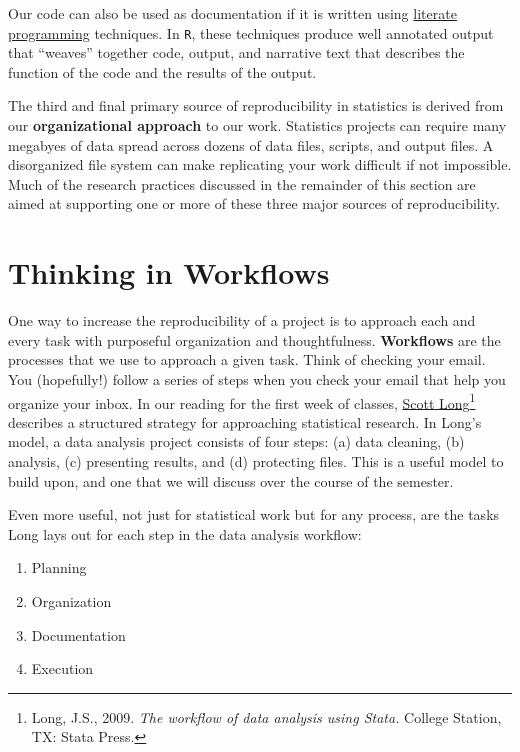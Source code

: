 \documentclass[]{book}
\providecommand{\tightlist}{%
  \setlength{\itemsep}{0pt}\setlength{\parskip}{0pt}}
\let\rmarkdownfootnote\footnote%
\def\footnote{\protect\rmarkdownfootnote}
\theoremstyle{definition}
\theoremstyle{definition}
\theoremstyle{definition}
\theoremstyle{remark}
\begin{document}
Our code can also be used as documentation if it is written using
\href{https://en.wikipedia.org/wiki/Literate_programming}{literate
programming} techniques. In \texttt{R}, these techniques produce well
annotated output that ``weaves'' together code, output, and narrative
text that describes the function of the code and the results of the
output.

The third and final primary source of reproducibility in statistics is
derived from our \textbf{organizational approach} to our work.
Statistics projects can require many megabyes of data spread across
dozens of data files, scripts, and output files. A disorganized file
system can make replicating your work difficult if not impossible. Much
of the research practices discussed in the remainder of this section are
aimed at supporting one or more of these three major sources of
reproducibility.

\section{Thinking in Workflows}\label{thinking-in-workflows}

One way to increase the reproducibility of a project is to approach each
and every task with purposeful organization and thoughtfulness.
\textbf{Workflows} are the processes that we use to approach a given
task. Think of checking your email. You (hopefully!) follow a series of
steps when you check your email that help you organize your inbox. In
our reading for the first week of classes,
\href{http://www.indiana.edu/~jslsoc/}{Scott Long}\footnote{Long, J.S.,
  2009. \emph{The workflow of data analysis using Stata.} College
  Station, TX: Stata Press.} describes a structured strategy for
approaching statistical research. In Long's model, a data analysis
project consists of four steps: (a) data cleaning, (b) analysis, (c)
presenting results, and (d) protecting files. This is a useful model to
build upon, and one that we will discuss over the course of the
semester.

Even more useful, not just for statistical work but for any process, are
the tasks Long lays out for each step in the data analysis workflow:

\begin{enumerate}
\def\labelenumi{\arabic{enumi}.}
\tightlist
\item
  Planning
\item
  Organization
\item
  Documentation
\item
  Execution
\end{enumerate}
\end{document}
